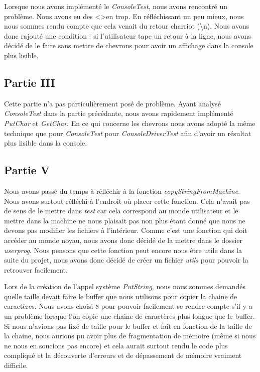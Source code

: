 \documentclass{article}
\begin{document}
Lorsque nous avons implémenté le \textit{ConsoleTest}, nous avons rencontré un
problème. Nous avons eu des \textless \textgreater en trop. En réfléchissant un
peu mieux, nous nous sommes rendu compte que cela venait du retour charriot
(\textbackslash n). Nous avons donc rajouté une condition : si l'utilisateur
tape un retour à la ligne, nous avons décidé de le faire sans mettre de
chevrons pour avoir un affichage dans la console plus lisible.

\subsection{Partie III}
Cette partie n'a pas particulièrement posé de problème. Ayant analysé
\textit{ConsoleTest} dans la partie précédante, nous avons rapidement
implémenté \textit{PutChar} et \textit{GetChar}. En ce qui concerne les
chevrons nous avons adopté la même technique que pour \textit{ConsoleTest} pour
\textit{ConsoleDriverTest} afin d'avoir un résultat plus lisible dans la
console.

\subsection{Partie V}
Nous avons passé du temps à réfléchir à la fonction
\textit{copyStringFromMachine}. Nous avons surtout réfléchi à l'endroit où
placer cette fonction. Cela n'avait pas de sens de le mettre dans \textit{test}
car cela correspond au monde utilisateur et le mettre dans la machine ne nous
plaisait pas non plus étant donné que nous ne devons pas modifier les fichiers
à l'intérieur. Comme c'est une fonction qui doit accéder au monde noyau, nous
avons donc décidé de la mettre dans le dossier \textit{userprog}. Nous pensons
que cette fonction peut encore nous être utile dans la suite du projet, nous
avons donc décidé de créer un fichier \textit{utils} pour pouvoir la retrouver
facilement.

Lors de la création de l'appel système \textit{PutString}, nous nous sommes
demandés quelle taille devait faire le buffer que nous utilisons pour copier la
chaine de caractères. Nous avons choisi 8 pour pouvoir facilement se rendre
compte s'il y a un problème lorsque l'on copie une chaine de caractères plus
longue que le buffer. Si nous n'avions pas fixé de taille pour le buffer et
fait en fonction de la taille de la chaine, nous aurions pu avoir plus de
fragmentation de mémoire (même si nous ne nous en soucions pas encore) et cela
aurait surtout rendu le code plus compliqué et la découverte d'erreurs et de
dépassement de mémoire vraiment difficile.
\end{document}

